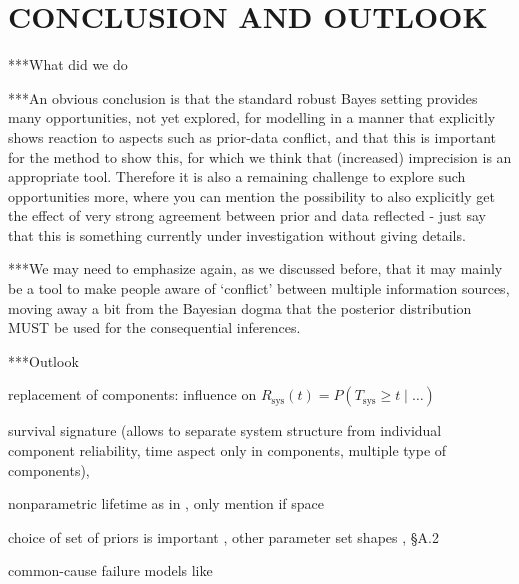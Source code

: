 \documentclass[12pt,a4paper,twocolumn,fleqn]{narms}
\newcommand{\comments}[1]{{\small\color{gray} #1}}
\begin{document}
\section{CONCLUSION AND OUTLOOK}
\label{sec:conclusion}

***What did we do

***An obvious conclusion is that
the standard robust Bayes setting provides many opportunities, not yet explored, for modelling
in a manner that explicitly shows reaction to aspects such as prior-data conflict, and that this
is important for the method to show this, for which we think that (increased) imprecision is an
appropriate tool. Therefore it is also a remaining challenge to explore such opportunities more,
where you can mention the possibility to also explicitly get the effect of very strong agreement
between prior and data reflected - just say that this is something currently under investigation
without giving details.

***We may need to emphasize again, as we discussed before, that it may
mainly be a tool to make people aware of `conflict' between multiple information sources,
moving away a bit from the Bayesian dogma that the posterior distribution MUST
be used for the consequential inferences.

***Outlook

replacement of components: influence on $R_\text{sys}(t) = P(T_\text{sys} \geq t \mid \ldots)$ 

survival signature \cite{2012:survsign} (allows to separate system structure from individual component reliability,
time aspect only in components, multiple type of components),

nonparametric lifetime as in , \comments{only mention if space}

choice of set of priors is important \cite{1991:pericchi},
other parameter set shapes \cite{Walter2011a}, \cite{diss} \S A.2

common-cause failure models like \cite{Troffaes2014a,2015:coolen-commoncause}



\end{document}
